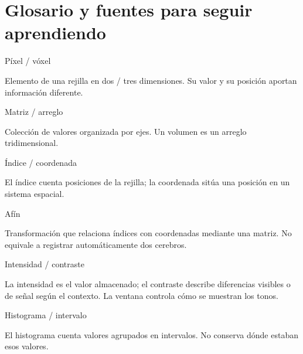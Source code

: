 \chapter[Glosario y fuentes]{Glosario y fuentes para seguir aprendiendo}


\begin{Idea}{Píxel / vóxel}

Elemento de una rejilla en dos / tres dimensiones. Su valor y su posición aportan información diferente.


\end{Idea}


\begin{Idea}{Matriz / arreglo}

Colección de valores organizada por ejes. Un volumen es un arreglo tridimensional.


\end{Idea}


\begin{Idea}{Índice / coordenada}

El índice cuenta posiciones de la rejilla; la coordenada sitúa una posición en un sistema espacial.


\end{Idea}


\begin{Idea}{Afín}

Transformación que relaciona índices con coordenadas mediante una matriz. No equivale a registrar automáticamente dos cerebros.


\end{Idea}


\begin{Idea}{Intensidad / contraste}

La intensidad es el valor almacenado; el contraste describe diferencias visibles o de señal según el contexto. La ventana controla cómo se muestran los tonos.


\end{Idea}


\begin{Idea}{Histograma / intervalo}

El histograma cuenta valores agrupados en intervalos. No conserva dónde estaban esos valores.


\end{Idea}

